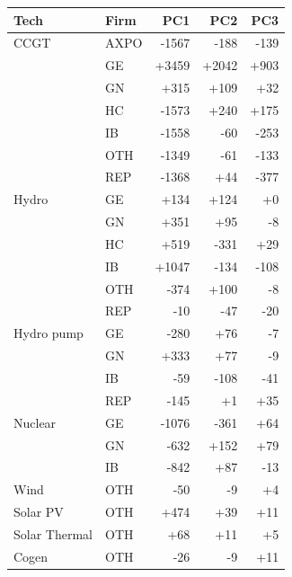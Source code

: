 \begin{tabular}{l l r r r}
\toprule
Tech & Firm & PC1 & PC2 & PC3 \\
\midrule
CCGT & AXPO & -1567 & -188 & -139 \\
 & GE & +3459 & +2042 & +903 \\
 & GN & +315 & +109 & +32 \\
 & HC & -1573 & +240 & +175 \\
 & IB & -1558 & -60 & -253 \\
 & OTH & -1349 & -61 & -133 \\
 & REP & -1368 & +44 & -377 \\
\addlinespace
Hydro & GE & +134 & +124 & +0 \\
 & GN & +351 & +95 & -8 \\
 & HC & +519 & -331 & +29 \\
 & IB & +1047 & -134 & -108 \\
 & OTH & -374 & +100 & -8 \\
 & REP & -10 & -47 & -20 \\
\addlinespace
Hydro pump & GE & -280 & +76 & -7 \\
 & GN & +333 & +77 & -9 \\
 & IB & -59 & -108 & -41 \\
 & REP & -145 & +1 & +35 \\
\addlinespace
Nuclear & GE & -1076 & -361 & +64 \\
 & GN & -632 & +152 & +79 \\
 & IB & -842 & +87 & -13 \\
\addlinespace
Wind & OTH & -50 & -9 & +4 \\
\addlinespace
Solar PV & OTH & +474 & +39 & +11 \\
\addlinespace
Solar Thermal & OTH & +68 & +11 & +5 \\
\addlinespace
Cogen & OTH & -26 & -9 & +11 \\
\bottomrule
\end{tabular}